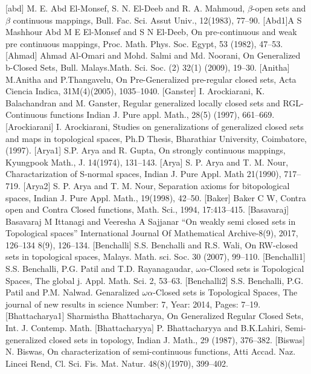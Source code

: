 \begin{thebibliography}{99}
 [abd] M. E. Abd El-Monsef, S. N. El-Deeb and R. A. Mahmoud, $\beta$-open sets and $\beta$ continuous mappings, Bull. Fac. Sci. Assut Univ., 12(1983), 77--90.
 [Abd1]A S Mashhour Abd M E El-Monsef and S N El-Deeb, On pre-continuous and weak pre continuous mappings, Proc. Math. Phys. Soc. Egypt, 53 (1982), 47--53.
  [Ahmad] Ahmad Al-Omari and Mohd. Salmi and Md. Noorani, On Generalized b-Closed Sets, Bull. Malays.Math. Sci. Soc. (2) 32(1) (2009), 19--30.
  [Anitha] M.Anitha and P.Thangavelu, On Pre-Generalized pre-regular closed sets, Acta Ciencia Indica, 31M(4)(2005), 1035--1040.
 [Ganster] I. Arockiarani, K. Balachandran and M. Ganster, Regular generalized locally closed sets and RGL-Continuous functions Indian J. Pure appl. Math., 28(5) (1997), 661--669.
 [Arockiarani] I. Arockiarani, Studies on generalizations of generalized closed sets and maps in topological spaces, Ph.D Thesis, Bharathiar University, Coimbatore, (1997).
 [Arya1] S.P. Arya and R. Gupta, On strongly continuous mappings, Kyungpook Math., J. 14(1974), 131--143.
 [Arya] S. P. Arya and T. M. Nour, Charactarization of S-normal spaces, Indian J. Pure Appl. Math  21(1990), 717--719.
  [Arya2] S. P. Arya and T. M. Nour, Separation axioms for bitopological spaces, Indian J. Pure Appl. Math., 19(1998), 42--50.
 [Baker] Baker C W, Contra open and Contra Closed functions, Math. Sci., 1994, 17:413--415.
 [Basavaraj] Basavaraj M Ittanagi and Veeresha A Sajjanar ``On weakly semi closed sets in Topological spaces''  International Journal Of Mathematical Archive-8(9), 2017, 126--134 8(9), 126--134.
  [Benchalli] S.S. Benchalli and R.S. Wali, On RW-closed sets in topological spaces, Malays. Math. sci. Soc. 30 (2007), 99--110.
 [Benchalli1] S.S. Benchalli, P.G. Patil and T.D. Rayanagaudar, $\omega\alpha$-Closed sets is Topological Spaces, The global j. Appl. Math. Sci. 2, 53--63.
 [Benchalli2] S.S. Benchalli, P.G. Patil and P.M. Nalwad. Genaralized  $\omega\alpha$-Closed sets is Topological Spaces, The journal of new results in science Number: 7, Year: 2014, Pages: 7--19.
 [Bhattacharya1] Sharmistha Bhattacharya, On Generalized Regular Closed Sets, Int. J. Contemp. Math.  
 [Bhattacharyya]	P. Bhattacharyya and B.K.Lahiri, Semi-generalized closed sets in topology, Indian J. Math., 29 	(1987), 376--382.
 [Biswas] N. Biswas, On characterization of semi-continuous functions, Atti Accad. Naz. Lincei Rend, Cl. Sci. Fis. Mat. Natur. 48(8)(1970), 399--402.

\end{thebibliography}
